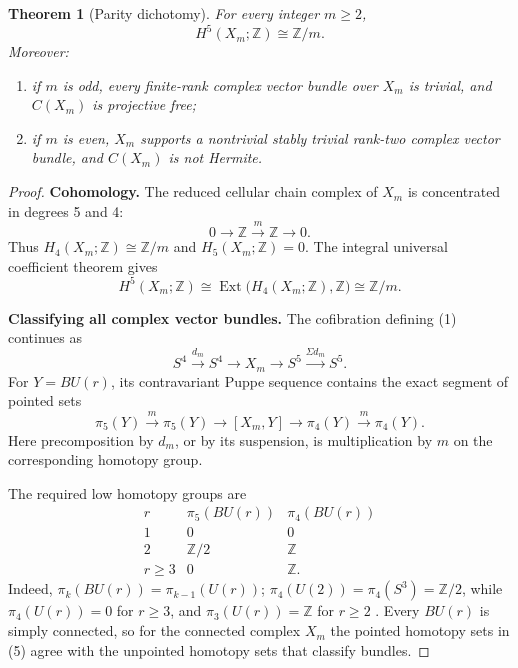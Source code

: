 \documentclass[11pt]{article}
\newtheorem{theorem}{Theorem}
\theoremstyle{remark}
\newcommand{\Z}{\mathbb Z}
\newcommand{\Xm}{X_m}
\begin{document}
\begin{theorem}[Parity dichotomy]
\label{thm:main}
For every integer \(m\ge2\),
\[
                  H^5(\Xm;\Z)\cong\Z/m.
\]
Moreover:
\begin{enumerate}
\item if \(m\) is odd, every finite-rank complex vector bundle over \(\Xm\)
  is trivial, and \(C(\Xm)\) is projective free;
\item if \(m\) is even, \(\Xm\) supports a nontrivial stably trivial
  rank-two complex vector bundle, and \(C(\Xm)\) is not Hermite.
\end{enumerate}
\end{theorem}

\begin{proof}
\textbf{Cohomology.}
The reduced cellular chain complex of \(\Xm\) is concentrated in degrees
5 and 4:
\[
                 0\longrightarrow\Z
                   \xrightarrow{\ m\ }\Z\longrightarrow0.     \tag{2}
\]
Thus \(H_4(\Xm;\Z)\cong\Z/m\) and \(H_5(\Xm;\Z)=0\).  The integral
universal coefficient theorem gives
\[
 H^5(\Xm;\Z)
 \cong \operatorname{Ext}\bigl(H_4(\Xm;\Z),\Z\bigr)
 \cong \Z/m.                                                   \tag{3}
\]

\medskip
\noindent
\textbf{Classifying all complex vector bundles.}
The cofibration defining (1) continues as
\[
 S^4\xrightarrow{d_m}S^4\longrightarrow\Xm
 \longrightarrow S^5\xrightarrow{\Sigma d_m}S^5.             \tag{4}
\]
For \(Y=BU(r)\), its contravariant Puppe sequence contains the exact
segment of pointed sets
\[
 \pi_5(Y)\xrightarrow{\ m\ }\pi_5(Y)
 \longrightarrow[\Xm,Y]\longrightarrow
 \pi_4(Y)\xrightarrow{\ m\ }\pi_4(Y).                          \tag{5}
\]
Here precomposition by \(d_m\), or by its suspension, is multiplication by
\(m\) on the corresponding homotopy group.

The required low homotopy groups are
\[
\begin{array}{c|c|c}
r&\pi_5(BU(r))&\pi_4(BU(r))\\ \hline
1&0&0\\
2&\Z/2&\Z\\
r\ge3&0&\Z .
\end{array}                                                     \tag{6}
\]
Indeed, \(\pi_k(BU(r))=\pi_{k-1}(U(r))\);
\(\pi_4(U(2))=\pi_4(S^3)=\Z/2\), while
\(\pi_4(U(r))=0\) for \(r\ge3\), and
\(\pi_3(U(r))=\Z\) for \(r\ge2\) \cite{hatcherVB,mimura}.
Every \(BU(r)\) is simply connected, so for the connected complex \(\Xm\)
the pointed homotopy sets in (5) agree with the unpointed homotopy sets
that classify bundles.


\end{proof}
\end{document}
